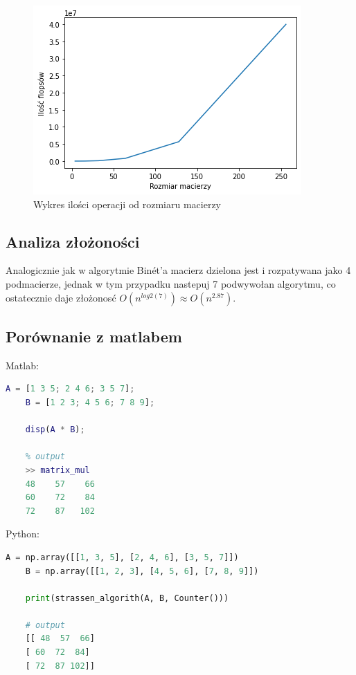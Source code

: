 \documentclass[12pt,a4paper,table]{article}
\begin{document}
    \begin{figure}[H]
        \centering
        \includegraphics[width=0.6\linewidth]{img/strassen_flops.png}
        \caption{Wykres ilości operacji od rozmiaru macierzy}
        \label{fig:strassen_flops}
    \end{figure}

    \subsection{Analiza złożoności}
    Analogicznie jak w algorytmie Binét'a macierz 
    dzielona jest i rozpatywana jako 4 podmacierze, 
    jednak w tym przypadku nastepuj 7 podwywołan 
    algorytmu, co ostatecznie daje złożonosć $O(n^{log2(7)}) \approx O(n^{2.87})$.

    \subsection{Porównanie z matlabem}
    Matlab:
    \begin{lstlisting}[language=Matlab]
    A = [1 3 5; 2 4 6; 3 5 7];
    B = [1 2 3; 4 5 6; 7 8 9];

    disp(A * B);

    % output
    >> matrix_mul
    48    57    66
    60    72    84
    72    87   102
    \end{lstlisting}
    Python:
    \begin{lstlisting}[language=Python]
    A = np.array([[1, 3, 5], [2, 4, 6], [3, 5, 7]])
    B = np.array([[1, 2, 3], [4, 5, 6], [7, 8, 9]])
    
    print(strassen_algorith(A, B, Counter()))

    # output
    [[ 48  57  66]
    [ 60  72  84]
    [ 72  87 102]]
    \end{lstlisting}
    
    \newpage
\end{document}
